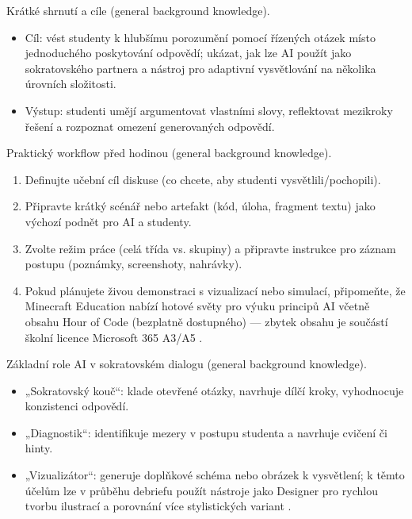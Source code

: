 Krátké shrnutí a cíle (general background knowledge).
\begin{itemize}
  \item Cíl: vést studenty k hlubšímu porozumění pomocí řízených otázek místo jednoduchého poskytování odpovědí; ukázat, jak lze AI použít jako sokratovského partnera a nástroj pro adaptivní vysvětlování na několika úrovních složitosti.
  \item Výstup: studenti umějí argumentovat vlastními slovy, reflektovat mezikroky řešení a rozpoznat omezení generovaných odpovědí.
\end{itemize}

Praktický workflow před hodinou (general background knowledge).
\begin{enumerate}
  \item Definujte učební cíl diskuse (co chcete, aby studenti vysvětlili/pochopili).
  \item Připravte krátký scénář nebo artefakt (kód, úloha, fragment textu) jako výchozí podnět pro AI a studenty.
  \item Zvolte režim práce (celá třída vs. skupiny) a připravte instrukce pro záznam postupu (poznámky, screenshoty, nahrávky).
  \item Pokud plánujete živou demonstraci s vizualizací nebo simulací, připomeňte, že Minecraft Education nabízí hotové světy pro výuku principů AI včetně obsahu Hour of Code (bezplatně dostupného) — zbytek obsahu je součástí školní licence Microsoft 365 A3/A5 \cite{kb_ai_101_tipu_pdf_04e4a115_page_15_2}. 
\end{enumerate}

Základní role AI v sokratovském dialogu (general background knowledge).
\begin{itemize}
  \item „Sokratovský kouč“: klade otevřené otázky, navrhuje dílčí kroky, vyhodnocuje konzistenci odpovědí.
  \item „Diagnostik“: identifikuje mezery v postupu studenta a navrhuje cvičení či hinty.
  \item „Vizualizátor“: generuje doplňkové schéma nebo obrázek k vysvětlení; k těmto účelům lze v průběhu debriefu použít nástroje jako Designer pro rychlou tvorbu ilustrací a porovnání více stylistických variant \cite{kb_ai_101_tipu_pdf_04e4a115_page_51_1}.
\end{itemize}

